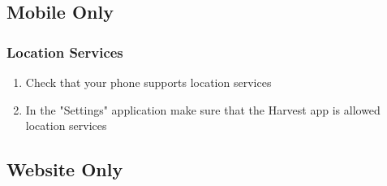 \documentclass[11pt]{article}
\begin{document}
\subsection{Mobile Only}
\subsubsection{Location Services}
\begin{enumerate}
\item Check that your phone supports location services
\item In the "Settings" application make sure that the Harvest app is allowed location services
\end{enumerate}

\subsection{Website Only}
\end{document}
